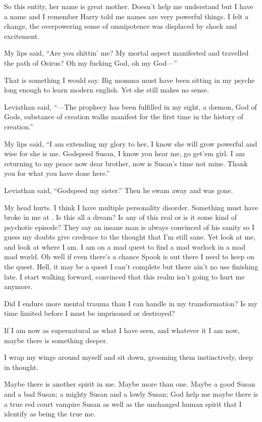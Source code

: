 So this entity, her name is great mother. Doesn't help me understand but I have a name and I remember Harry told me names are very powerful things. I felt a change, the overpowering sense of omnipotence was displaced by shock and excitement.

My lips said, ``Are you shittin' me? My mortal aspect manifested and travelled the path of Osirus? Oh my fucking God, oh my God---''

That is something I would say. Big momma must have been sitting in my psyche long enough to learn modern english. Yet she still makes no sense.

Leviathan said, ``---The prophecy has been fulfilled in my sight, a d\ae mon, God of Gods, substance of creation walks manifest for the first time in the history of creation.''

My lips said, ``I am extending my glory to her, I know she will grow powerful and wise for she is me. Godspeed Susan, I know you hear me, go get'em girl. I am returning to my peace now dear brother, now is Susan's time not mine. Thank you for what you have done here.''

Leviathan said, ``Godspeed my sister.'' Then he swam away and was gone.

\parasep

My head hurts. I think I have multiple personality disorder. Something must have broke in me at \chichenitza*. Is this all a dream? Is any of this real or is it some kind of psychotic episode? They say an insane man is always convinced of his sanity so I guess my doubts give credence to the thought that I'm still sane. Yet look at me, and look at where I am. I am on a mad quest to find a mad warlock in a mad mad world. Oh well if even there's a chance Spook is out there I need to keep on the quest. Hell, it may be a quest I can't complete but there ain't no use finishing late. I start walking forward, convinced that this realm isn't going to hurt me anymore.

Did I endure more mental trauma than I can handle in my transformation? Is my time limited before I must be imprisoned or destroyed?

If I am now as supernatural as what I have seen, and whatever it I am now, maybe there is something deeper. 

I wrap my wings around myself and sit down, grooming them instinctively, deep in thought.

Maybe there is another spirit in me. Maybe more than one. Maybe a good Susan and a bad Susan; a mighty Susan and a lowly Susan; God help me maybe there is a true red court vampire Susan as well as the unchanged human spirit that I identify as being the true me.

